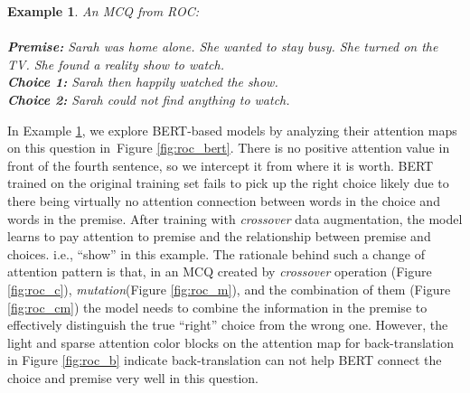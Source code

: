 \documentclass[11pt,a4paper]{article}
\newcommand{\crosssymbol}{{ \XSolidBrush} }
\newcommand{\checksymbol}{{\Checkmark} }
\newtheorem{example}{Example}
\newcommand{\figref}[1]{Figure \ref{#1}}
\newcommand{\exref}[1]{Example \ref{#1}}
\begin{document}
\begin{example}\label{ex:roc}
An MCQ from ROC:\\ \\
\noindent
\textbf{Premise:} Sarah was home alone. She wanted to stay busy. She turned on the TV. 
She found a reality show to watch.  \\
\textbf{Choice 1:} Sarah then happily watched the show.  \checksymbol  \\
\textbf{Choice 2:} Sarah could not find anything to watch. \crosssymbol
\end{example}

In \exref{ex:roc}, we explore BERT-based models by 
analyzing their attention maps on this question in~\figref{fig:roc_bert}.  
There is no 
positive attention value in front of the fourth sentence, 
so we intercept it from where it is worth. 
BERT trained on the original training set fails 
to pick up the right choice likely due to there being 
virtually no attention connection between words in 
the choice and words in the premise.
After training with \textit{crossover} data augmentation, 
the model learns  
to pay attention to premise and the relationship 
between premise and choices. 
i.e., ``show'' in this example. The rationale behind 
such a change of attention pattern is that, 
in an MCQ created by \textit{crossover} operation (\figref{fig:roc_c}), \textit{mutation}(\figref{fig:roc_m}), 
and the combination of them (\figref{fig:roc_cm})
the model needs to combine the information 
in the premise to effectively 
distinguish the true ``right'' choice from the wrong one. 
However, the light and sparse attention color blocks on the attention map for back-translation 
in \figref{fig:roc_b} indicate back-translation 
can not help BERT connect the choice and premise very well in this question.
\end{document}
